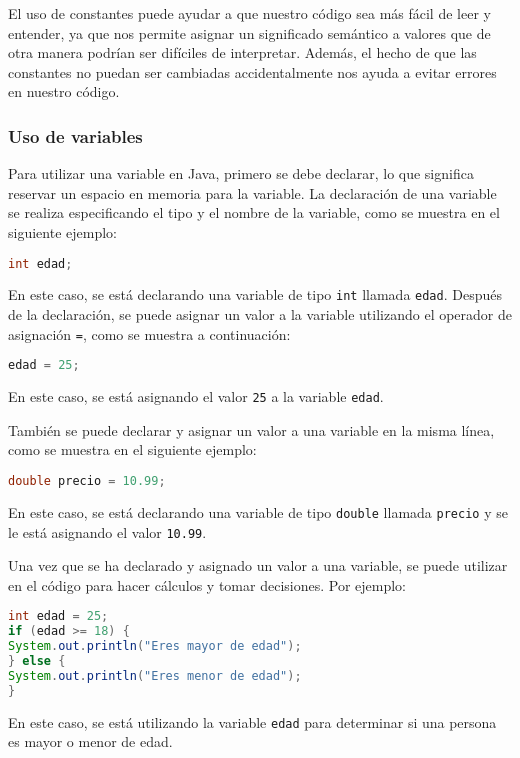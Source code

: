 \documentclass{article}
\begin{document}
El uso de constantes puede ayudar a que nuestro código sea más fácil de leer y entender, ya que nos permite asignar un significado semántico a valores que de otra manera podrían ser difíciles de interpretar. Además, el hecho de que las constantes no puedan ser cambiadas accidentalmente nos ayuda a evitar errores en nuestro código.

\subsubsection{Uso de variables}
Para utilizar una variable en Java, primero se debe declarar, lo que significa reservar un espacio en memoria para la variable. La declaración de una variable se realiza especificando el tipo y el nombre de la variable, como se muestra en el siguiente ejemplo:

\begin{lstlisting}[language=Java]
int edad;
\end{lstlisting}
En este caso, se está declarando una variable de tipo \lstinline{int} llamada \lstinline{edad}. Después de la declaración, se puede asignar un valor a la variable utilizando el operador de asignación \lstinline{=}, como se muestra a continuación:

\begin{lstlisting}[language=Java]
edad = 25;
\end{lstlisting}
En este caso, se está asignando el valor \lstinline{25} a la variable \lstinline{edad}.

También se puede declarar y asignar un valor a una variable en la misma línea, como se muestra en el siguiente ejemplo:

\begin{lstlisting}[language=Java]
double precio = 10.99;
\end{lstlisting}
En este caso, se está declarando una variable de tipo \lstinline{double} llamada \lstinline{precio} y se le está asignando el valor \lstinline{10.99}.

Una vez que se ha declarado y asignado un valor a una variable, se puede utilizar en el código para hacer cálculos y tomar decisiones. Por ejemplo:

\begin{lstlisting}[language=Java]
int edad = 25;
if (edad >= 18) {
System.out.println("Eres mayor de edad");
} else {
System.out.println("Eres menor de edad");
}
\end{lstlisting}
En este caso, se está utilizando la variable \lstinline{edad} para determinar si una persona es mayor o menor de edad.
\end{document}
